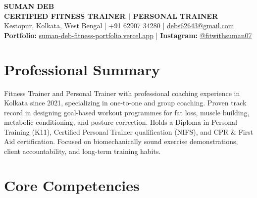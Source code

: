 \documentclass[10pt,a4paper]{article}
\begin{document}
\color{muted}

\fontsize{10.2pt}{12.1pt}\selectfont

\begin{center}
  {\LARGE\bfseries\color{classicblue} SUMAN DEB}\\[3pt]
  {\large\bfseries CERTIFIED FITNESS TRAINER \;|\; PERSONAL TRAINER}\\[4pt]
  {\small Kestopur, Kolkata, West Bengal \;\;|\;\;
  +91 62907 34280 \;\;|\;\;
  \href{mailto:debs62643@gmail.com}{debs62643@gmail.com}}\\[3pt]
  {\small
  \textbf{Portfolio:} \href{https://suman-deb-fitness-portfolio.vercel.app/}{suman-deb-fitness-portfolio.vercel.app} \;\;\;|\;\;\;
  \textbf{Instagram:} \href{https://www.instagram.com/fitwithsuman07}{@fitwithsuman07}}
\end{center}

\vspace{-5pt}

\section{Professional Summary}

Fitness Trainer and Personal Trainer with professional coaching experience in Kolkata since 2021, specializing in one-to-one and group coaching. Proven track record in designing goal-based workout programmes for fat loss, muscle building, metabolic conditioning, and posture correction. Holds a Diploma in Personal Training (K11), Certified Personal Trainer qualification (NIFS), and CPR \& First Aid certification. Focused on biomechanically sound exercise demonstrations, client accountability, and long-term training habits.

\section{Core Competencies}
\end{document}
